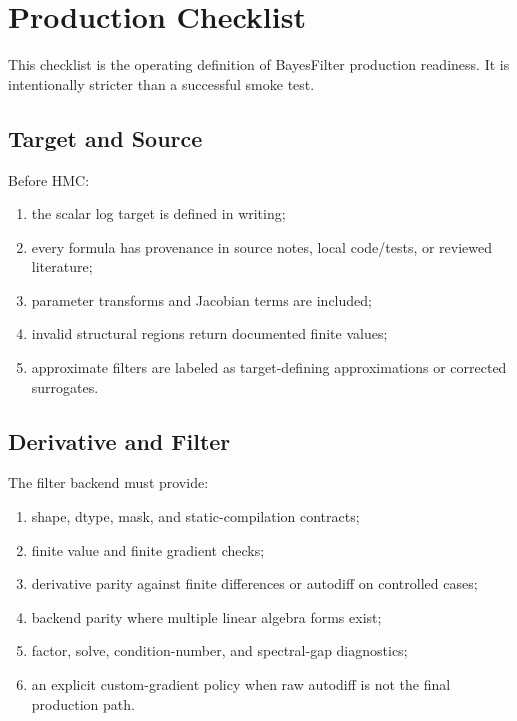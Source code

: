 \chapter{Production Checklist}
\label{ch:bf-production-checklist}

This checklist is the operating definition of BayesFilter production readiness.
It is intentionally stricter than a successful smoke test.

\section{Target and Source}
\label{sec:bf-production-target-source}

Before HMC:
\begin{enumerate}[label=(\roman*)]
  \item the scalar log target is defined in writing;
  \item every formula has provenance in source notes, local code/tests, or
    reviewed literature;
  \item parameter transforms and Jacobian terms are included;
  \item invalid structural regions return documented finite values;
  \item approximate filters are labeled as target-defining approximations or
    corrected surrogates.
\end{enumerate}

\section{Derivative and Filter}
\label{sec:bf-production-derivative-filter}

The filter backend must provide:
\begin{enumerate}[label=(\roman*)]
  \item shape, dtype, mask, and static-compilation contracts;
  \item finite value and finite gradient checks;
  \item derivative parity against finite differences or autodiff on controlled
    cases;
  \item backend parity where multiple linear algebra forms exist;
  \item factor, solve, condition-number, and spectral-gap diagnostics;
  \item an explicit custom-gradient policy when raw autodiff is not the final
    production path.
\end{enumerate}

